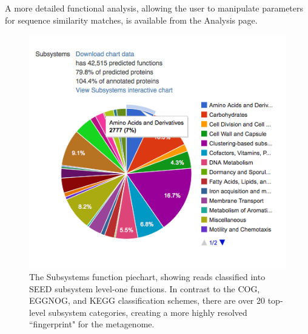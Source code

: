 \documentclass[12pt,fullpage]{report}
\begin{document}
A more detailed functional analysis, allowing the user to manipulate parameters for sequence similarity matches, is available from the Analysis page.

\begin{figure}
\begin{center}
\includegraphics[width=6in]{Images/subsystems-functions-piechart.png}
\end{center}
\caption{
The \gls{Subsystem}s function piechart, showing reads classified into SEED subsystem level-one functions. In contrast to the COG, EGGNOG, and KEGG classification schemes, there are over 20 top-level subsystem categories, creating a more highly resolved ``fingerprint" for the metagenome.
}
\label{fig:subsystems-functions-piechart}
\end{figure}





\end{document}
